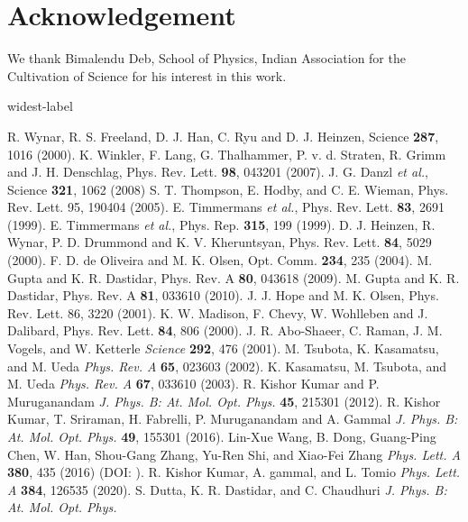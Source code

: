 \documentclass[10pt,a4paper]{article}
\begin{document}
\section {Acknowledgement}


We thank Bimalendu Deb, School of Physics, Indian Association for
the Cultivation of Science for his interest in this work.

\begin{thebibliography}{widest-label}

 R. Wynar, R. S. Freeland, D. J. Han, C. Ryu and D. J. Heinzen, Science {\bf 287}, 1016
(2000).
 K. Winkler, F. Lang, G. Thalhammer, P. v. d. Straten, R. Grimm and J. H. Denschlag,
Phys. Rev. Lett. {\bf 98}, 043201 (2007).
 J. G. Danzl {\it et al.}, Science {\bf 321}, 1062 (2008)
 S. T. Thompson, E. Hodby, and C. E. Wieman, Phys. Rev. Lett. 95,
190404 (2005).
 E. Timmermans {\it et al.}, Phys. Rev. Lett. {\bf83},
2691 (1999).
 E. Timmermans {\it et al.}, Phys. Rep. {\bf315},
199 (1999).
 D. J. Heinzen, R. Wynar, P. D. Drummond and K. V. Kheruntsyan,
Phys. Rev. Lett. {\bf84}, 5029 (2000).
 F. D. de Oliveira and M. K. Olsen, Opt. Comm. {\bf234}, 235
(2004).
 M. Gupta and K. R. Dastidar, Phys. Rev. A {\bf 80}, 043618
(2009).
 M. Gupta and K. R. Dastidar, Phys. Rev. A {\bf 81}, 033610
(2010).
 J. J. Hope and M. K. Olsen, Phys. Rev. Lett. 86, 3220 (2001).
 K. W. Madison, F. Chevy, W. Wohlleben  and J. Dalibard, Phys. Rev. Lett. {\bf 84},
806 (2000).
  J. R. Abo-Shaeer, C. Raman, J. M. Vogels, and W. Ketterle {\it Science} {\bf 292}, 476
(2001).
  M. Tsubota, K. Kasamatsu, and M. Ueda {\it Phys. Rev. A} {\bf 65}, 023603
(2002).
 K. Kasamatsu, M. Tsubota, and M. Ueda {\it Phys. Rev. A} {\bf 67}, 033610 (2003).
 R. Kishor Kumar and P. Muruganandam {\it J. Phys. B: At. Mol. Opt. Phys.} {\bf 45}, 215301 (2012).
 R. Kishor Kumar, T. Sriraman, H. Fabrelli, P. Muruganandam and A. Gammal {\it J. Phys. B: At.
Mol. Opt. Phys.} {\bf 49}, 155301 (2016).
 Lin-Xue Wang, B. Dong, Guang-Ping Chen, W. Han, Shou-Gang Zhang, Yu-Ren Shi, and Xiao-Fei Zhang {\it Phys. Lett. A} {\bf 380}, 435 (2016) (DOI: ).
 R. Kishor Kumar, A. gammal, and L. Tomio {\it Phys. Lett. A} {\bf 384}, 126535 (2020).
 S. Dutta, K. R. Dastidar, and C. Chaudhuri {\it J. Phys. B: At. Mol. Opt. Phys.} {\bf
}
\end{thebibliography}
\end{document}
